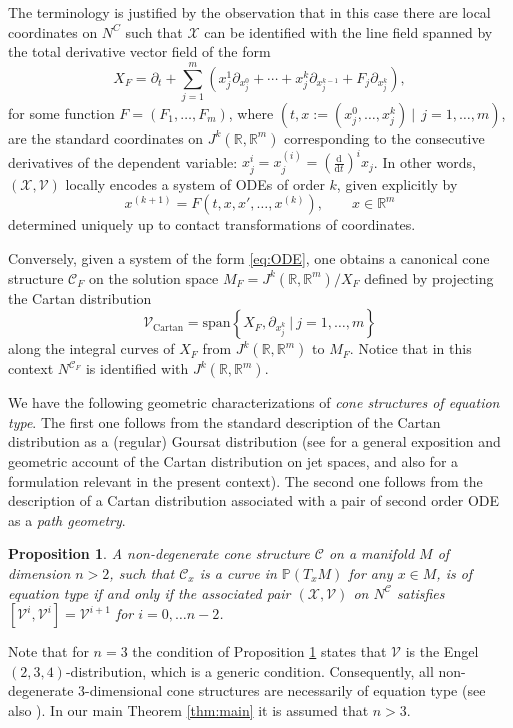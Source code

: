 \documentclass[11pt]{amsart}
\newtheorem{proposition}[theorem]{Proposition}
\theoremstyle{definition}
\newcommand{\R}{\mathbb{R}}
\newcommand{\PP}{\mathbb{P}}
\newcommand{\spn}{\mathrm{span}}
\newcommand{\VV}{\mathcal{V}}
\newcommand{\XX}{\mathcal{X}}
\newcommand{\CC}{\mathcal{C}}
\newcommand{\dd}{\mathrm{d}}
\begin{document}
The terminology is justified by the observation that in this case there are local coordinates on $N^C$ such that $\XX$ can be identified with the line field spanned by the total derivative vector field of the form
\[
X_F=\partial_t+\sum_{j=1}^m\left(x^1_j\partial_{x^0_j}+\cdots+x^{k}_j\partial_{x^{k-1}_j}+F_j\partial_{x^{k}_j}\right),
\]
for some function $F=(F_1,\ldots,F_m)$, where $(t,x:=(x^0_j,\ldots,x^{k}_j)\ |\ \ j=1,\ldots,m)$, are the standard coordinates on $J^{k}(\R,\R^m)$ corresponding to the consecutive derivatives of the dependent variable: $x^i_j=x^{(i)}_j=\left(\frac{\dd}{\dd t}\right)^ix_j$. In other words, $(\XX,\VV)$ locally encodes a system of ODEs of order $k$, given explicitly by
\begin{equation}\label{eq:ODE}
x^{(k+1)}=F(t,x,x',\ldots,x^{(k)}),\qquad x\in\R^m
\end{equation}
determined uniquely up to contact transformations of coordinates.


Conversely, given a system of the form \eqref{eq:ODE}, one obtains a canonical cone structure $\CC_F$ on the solution space $M_F=J^{k}(\R,\R^m)/X_F$ defined by projecting the Cartan distribution
\[
\VV_{\mathrm{Cartan}}=\spn\left\{X_F,\partial_{x^{k}_j}\ |\ j=1,\ldots,m\right\}
\]
along the integral curves of $X_F$ from $J^{k}(\R,\R^m)$ to $M_F$. Notice that in this context $N^{\CC_F}$ is identified with $J^{k}(\R,\R^m)$.


We have the following geometric characterizations of \emph{cone structures of equation type}. The first one follows from the standard description of the Cartan distribution as a (regular) Goursat distribution (see \cite{Y} for a general exposition and geometric account of the Cartan distribution on jet spaces, and also \cite{K2} for a formulation relevant in the present context). The second one follows from the description of a Cartan distribution associated with a pair of second order ODE as a \emph{path geometry}.
\begin{proposition}\label{prop1}
A non-degenerate cone structure $\CC$ on a manifold $M$ of dimension $n>2$, such that $\CC_x$ is a curve in $\PP(T_xM)$ for any $x\in M$, is of equation type if and only if the associated pair $(\XX,\VV)$ on $N^\CC$ satisfies $[\VV^i,\VV^i]=\VV^{i+1}$ for $i=0,\ldots n-2$.
\end{proposition}

Note that for $n=3$ the condition of Proposition \ref{prop1} states that $\VV$ is the Engel $(2,3,4)$-distribution, which is a generic condition. Consequently, all non-degenerate 3-dimensional cone structures are necessarily of equation type (see also \cite{FKN,HS}). In our main Theorem \ref{thm:main} it is assumed that $n>3$. 
\end{document}
